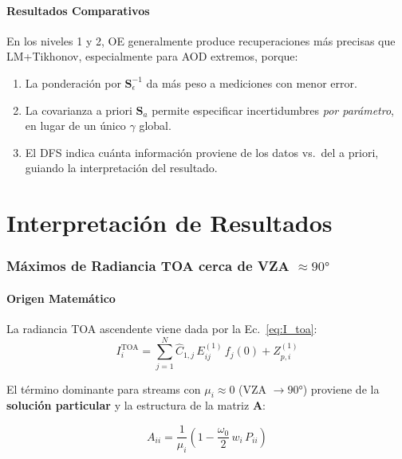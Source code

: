 \documentclass[a4paper,11pt]{article}
\begin{document}
\subsection{Resultados Comparativos}

En los niveles 1 y 2, OE generalmente produce recuperaciones m\'as precisas
que LM+Tikhonov, especialmente para AOD extremos, porque:
\begin{enumerate}
    \item La ponderaci\'on por $\mathbf{S}_\epsilon^{-1}$ da m\'as peso a
          mediciones con menor error.
    \item La covarianza a priori $\mathbf{S}_a$ permite especificar
          incertidumbres \emph{por par\'ametro}, en lugar de un \'unico
          $\gamma$ global.
    \item El DFS indica cu\'anta informaci\'on proviene de los datos vs.\ del
          a priori, guiando la interpretaci\'on del resultado.
\end{enumerate}


\part{Interpretaci\'on de Resultados}

\section{M\'aximos de Radiancia TOA cerca de VZA $\approx 90°$}
\label{sec:interp_vza}

\subsection{Origen Matem\'atico}

La radiancia TOA ascendente viene dada por la Ec.~\eqref{eq:I_toa}:
\[
I_i^{\text{TOA}} = \sum_{j=1}^{N}\hat{C}_{1,j}\,E^{(1)}_{ij}\,f_j(0)
+ Z_{p,i}^{(1)}
\]

El t\'ermino dominante para streams con $\mu_i \approx 0$ (VZA $\to 90°$) proviene
de la \textbf{soluci\'on particular} y la estructura de la matriz $\mathbf{A}$:

\begin{equation}\label{eq:A_mu_dependence}
    A_{ii} = \frac{1}{\mu_i}\left(1 - \frac{\omega_0}{2}\,w_i\,P_{ii}\right)
\end{equation}
\end{document}
